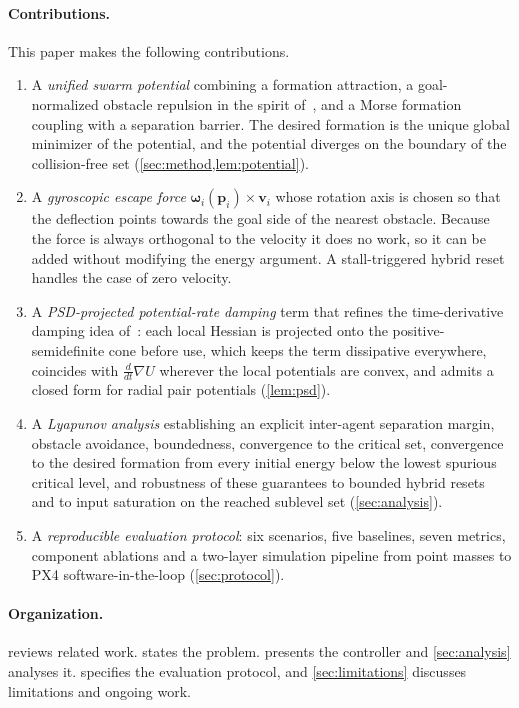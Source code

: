 \documentclass[11pt]{article}
\theoremstyle{definition}
\theoremstyle{remark}
\newcommand{\bp}{\mathbf{p}}
\newcommand{\bv}{\mathbf{v}}
\newcommand{\bomega}{\bm{\omega}}
\begin{document}
\paragraph{Contributions.} This paper makes the following contributions.
\begin{enumerate}[label=(C\arabic*),leftmargin=*]
  \item A \emph{unified swarm potential} combining a formation attraction, a
    goal-normalized obstacle repulsion in the spirit of~\cite{ge2000}, and a
    Morse formation coupling with a separation barrier. The desired formation is
    the unique global minimizer of the potential, and the potential diverges on
    the boundary of the collision-free set (\cref{sec:method,lem:potential}).
  \item A \emph{gyroscopic escape force} $\bomega_i(\bp_i)\times\bv_i$ whose
    rotation axis is chosen so that the deflection points towards the goal side
    of the nearest obstacle. Because the force is always orthogonal to the
    velocity it does no work, so it can be added without modifying the energy
    argument. A stall-triggered hybrid reset handles the case of zero velocity.
  \item A \emph{PSD-projected potential-rate damping} term that refines the
    time-derivative damping idea of~\cite{li2024lowosc,han2025time}: each local
    Hessian is projected onto the positive-semidefinite cone before use, which
    keeps the term dissipative everywhere, coincides with $\tfrac{d}{dt}\nabla U$
    wherever the local potentials are convex, and admits a closed form for
    radial pair potentials (\cref{lem:psd}).
  \item A \emph{Lyapunov analysis} establishing an explicit inter-agent
    separation margin, obstacle avoidance, boundedness, convergence to the
    critical set, convergence to the desired formation from every initial
    energy below the lowest spurious critical level, and robustness of these
    guarantees to bounded hybrid resets and to input saturation on the reached
    sublevel set (\cref{sec:analysis}).
  \item A \emph{reproducible evaluation protocol}: six scenarios, five
    baselines, seven metrics, component ablations and a two-layer simulation
    pipeline from point masses to PX4 software-in-the-loop (\cref{sec:protocol}).
\end{enumerate}

\paragraph{Organization.}  reviews related work.
 states the problem.  presents the
controller and \cref{sec:analysis} analyses it.  specifies
the evaluation protocol, and \cref{sec:limitations} discusses limitations and
ongoing work.
\end{document}
